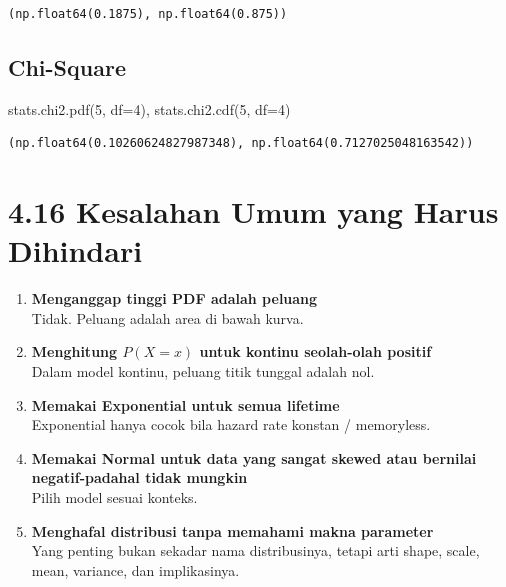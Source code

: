 \documentclass[
  letterpaper,
  DIV=11,
  numbers=noendperiod]{scrreprt}
\newenvironment{Shaded}{\begin{snugshade}}{\end{snugshade}}
\newcommand{\DecValTok}[1]{\textcolor[rgb]{0.68,0.00,0.00}{#1}}
\newcommand{\NormalTok}[1]{\textcolor[rgb]{0.00,0.23,0.31}{#1}}
\newcommand{\OperatorTok}[1]{\textcolor[rgb]{0.37,0.37,0.37}{#1}}
\begin{document}
\begin{verbatim}
(np.float64(0.1875), np.float64(0.875))
\end{verbatim}

\subsection{Chi-Square}\label{chi-square}

\begin{Shaded}
\begin{Highlighting}[]
\NormalTok{stats.chi2.pdf(}\DecValTok{5}\NormalTok{, df}\OperatorTok{=}\DecValTok{4}\NormalTok{), stats.chi2.cdf(}\DecValTok{5}\NormalTok{, df}\OperatorTok{=}\DecValTok{4}\NormalTok{)}
\end{Highlighting}
\end{Shaded}

\begin{verbatim}
(np.float64(0.10260624827987348), np.float64(0.7127025048163542))
\end{verbatim}

\section{4.16 Kesalahan Umum yang Harus
Dihindari}\label{kesalahan-umum-yang-harus-dihindari-1}

\begin{enumerate}
\def\labelenumi{\arabic{enumi}.}
\item
  \textbf{Menganggap tinggi PDF adalah peluang}\\
  Tidak. Peluang adalah area di bawah kurva.
\item
  \textbf{Menghitung \(P(X=x)\) untuk kontinu seolah-olah positif}\\
  Dalam model kontinu, peluang titik tunggal adalah nol.
\item
  \textbf{Memakai Exponential untuk semua lifetime}\\
  Exponential hanya cocok bila hazard rate konstan / memoryless.
\item
  \textbf{Memakai Normal untuk data yang sangat skewed atau bernilai
  negatif-padahal tidak mungkin}\\
  Pilih model sesuai konteks.
\item
  \textbf{Menghafal distribusi tanpa memahami makna parameter}\\
  Yang penting bukan sekadar nama distribusinya, tetapi arti shape,
  scale, mean, variance, dan implikasinya.
\end{enumerate}
\end{document}
